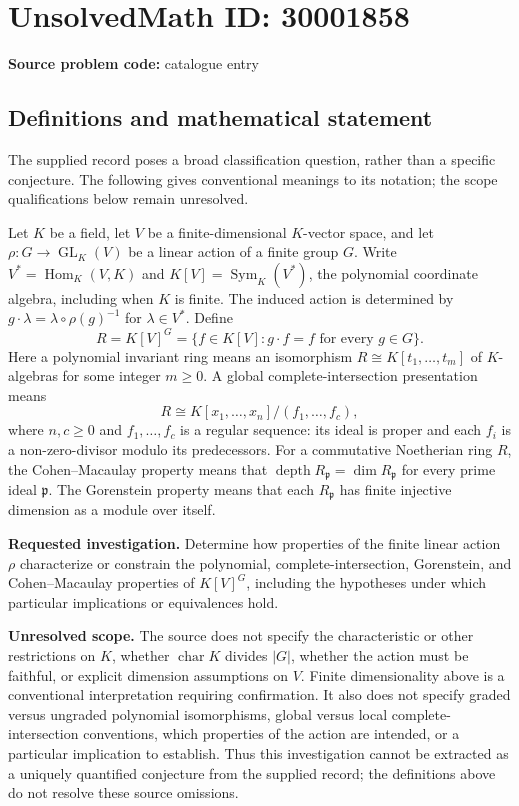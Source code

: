 \documentclass[11pt]{article}
\begin{document}
\section*{UnsolvedMath ID: 30001858}
\textbf{Source problem code:} catalogue entry
\subsection{Definitions and mathematical statement}
The supplied record poses a broad classification question, rather than a specific conjecture. The following gives conventional meanings to its notation; the scope qualifications below remain unresolved.

Let \(K\) be a field, let \(V\) be a finite-dimensional \(K\)-vector space, and let \(\rho\colon G\to\operatorname{GL}_K(V)\) be a linear action of a finite group \(G\). Write \(V^*=\operatorname{Hom}_K(V,K)\) and \(K[V]=\operatorname{Sym}_K(V^*)\), the polynomial coordinate algebra, including when \(K\) is finite. The induced action is determined by \(g\cdot\lambda=\lambda\circ\rho(g)^{-1}\) for \(\lambda\in V^*\). Define
\[
R=K[V]^G=\{f\in K[V]:g\cdot f=f\text{ for every }g\in G\}.
\]
Here a polynomial invariant ring means an isomorphism \(R\cong K[t_1,\ldots,t_m]\) of \(K\)-algebras for some integer \(m\geq 0\). A global complete-intersection presentation means
\[
R\cong K[x_1,\ldots,x_n]/(f_1,\ldots,f_c),
\]
where \(n,c\geq 0\) and \(f_1,\ldots,f_c\) is a regular sequence: its ideal is proper and each \(f_i\) is a non-zero-divisor modulo its predecessors. For a commutative Noetherian ring \(R\), the Cohen--Macaulay property means that \(\operatorname{depth}R_{\mathfrak p}=\dim R_{\mathfrak p}\) for every prime ideal \(\mathfrak p\). The Gorenstein property means that each \(R_{\mathfrak p}\) has finite injective dimension as a module over itself.

\textbf{Requested investigation.} Determine how properties of the finite linear action \(\rho\) characterize or constrain the polynomial, complete-intersection, Gorenstein, and Cohen--Macaulay properties of \(K[V]^G\), including the hypotheses under which particular implications or equivalences hold.

\textbf{Unresolved scope.} The source does not specify the characteristic or other restrictions on \(K\), whether \(\operatorname{char}K\) divides \(|G|\), whether the action must be faithful, or explicit dimension assumptions on \(V\). Finite dimensionality above is a conventional interpretation requiring confirmation. It also does not specify graded versus ungraded polynomial isomorphisms, global versus local complete-intersection conventions, which properties of the action are intended, or a particular implication to establish. Thus this investigation cannot be extracted as a uniquely quantified conjecture from the supplied record; the definitions above do not resolve these source omissions.
\end{document}
